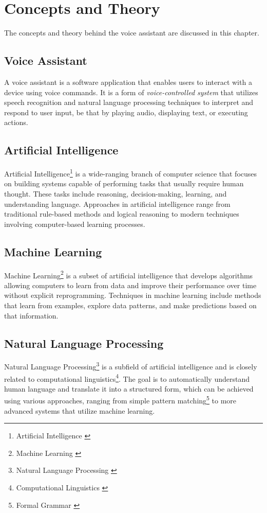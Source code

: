 \renewcommand*\chapterpagestyle{scrheadings}

\chapter{Concepts and Theory}
The concepts and theory behind the voice assistant are discussed in this chapter.

\section{Voice Assistant}
A voice assistant is a software application that enables users  
to interact with a device using voice commands.  
It is a form of \textit{voice-controlled system} that utilizes speech recognition  
and natural language processing techniques to interpret and respond  
to user input,  
be that by playing audio, displaying text, or executing actions.

\section{Artificial Intelligence}
Artificial Intelligence\footnote{Artificial Intelligence \cite{ai}} is a wide-ranging branch  
of computer science that focuses on building systems capable of performing  
tasks that usually require human thought.  
These tasks include reasoning, decision-making, learning, and understanding  
language. Approaches in artificial intelligence range from traditional rule-based methods  
and logical reasoning to modern techniques involving computer-based learning processes.

\section{Machine Learning}
Machine Learning\footnote{Machine Learning \cite{ml}} is a subset of artificial intelligence  
that develops algorithms allowing computers to learn from data and improve  
their performance over time without explicit reprogramming.  
Techniques in machine learning include methods that learn from examples,  
explore data patterns, and make predictions based on that information.

\section{Natural Language Processing}
Natural Language Processing\footnote{Natural Language Processing \cite{nlp}} is a subfield of artificial intelligence  
and is closely related to computational linguistics\footnote{Computational Linguistics \cite{cl}}.  
The goal is to automatically understand human language and translate it into  
a structured form, which can be achieved using various approaches,  
ranging from simple pattern matching\footnote{Formal Grammar \cite{pm}}  
to more advanced systems that utilize machine learning.
